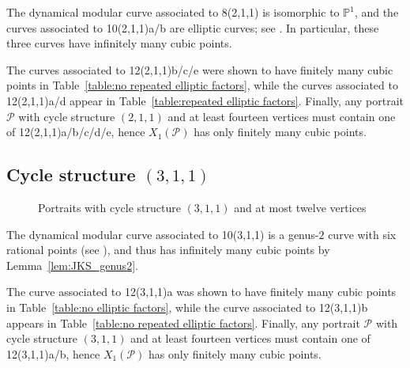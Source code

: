 \documentclass[12pt]{amsart}
\theoremstyle{definition}
\newcommand{\bbP}{\mathbb{P}}
\newcommand{\calP}{\mathcal{P}}
\numberwithin{equation}{section}
\begin{document}
The dynamical modular curve associated to 8(2,1,1) is isomorphic to $\bbP^1$, and the curves associated to 10(2,1,1)a/b are elliptic curves; see \cite{poonen:1998}. In particular, these three curves have infinitely many cubic points.

The curves associated to 12(2,1,1)b/c/e were shown to have finitely many cubic points in Table~\ref{table:no repeated elliptic factors}, while the curves associated to 12(2,1,1)a/d appear in Table~\ref{table:repeated elliptic factors}. Finally, any portrait $\calP$ with cycle structure $(2,1,1)$ and at least fourteen vertices must contain one of 12(2,1,1)a/b/c/d/e, hence $X_1(\calP)$ has only finitely many cubic points.

\subsection{Cycle structure $(3,1,1)$}

\begin{figure}
    \caption{Portraits with cycle structure $(3,1,1)$ and at most twelve vertices}
    \label{fig:(3,1,1)}
\end{figure}

The dynamical modular curve associated to 10(3,1,1) is a genus-$2$ curve with six rational points (see \cite{poonen:1998}),  and thus has infinitely many cubic points by Lemma~\ref{lem:JKS_genus2}.

The curve associated to 12(3,1,1)a was shown to have finitely many cubic points in Table~\ref{table:no elliptic factors}, while the curve associated to 12(3,1,1)b appears in Table~\ref{table:no repeated elliptic factors}. Finally, any portrait $\calP$ with cycle structure $(3,1,1)$ and at least fourteen vertices must contain one of 12(3,1,1)a/b, hence $X_1(\calP)$ has only finitely many cubic points.
\end{document}
